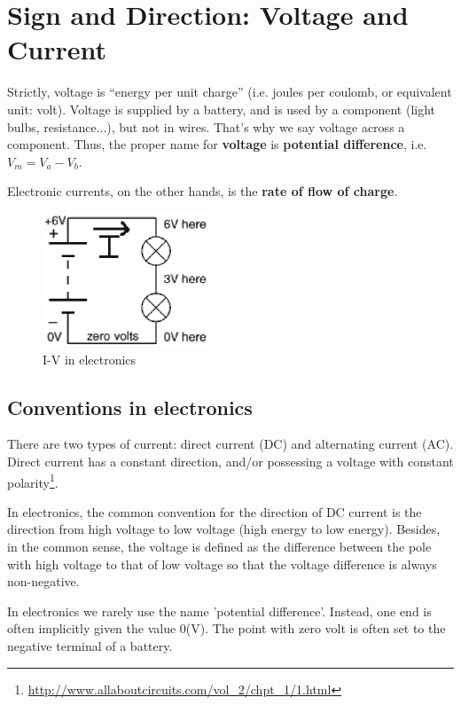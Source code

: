 \section{Sign and Direction: Voltage and Current}
\label{sec:voltage-current}

Strictly, voltage is ``energy per unit charge'' (i.e. joules per coulomb, or
equivalent unit: volt).
Voltage is supplied by a battery, and is used by a component (light bulbs,
resistance...), but not in wires. That's why we say voltage across a component. 
Thus, the proper name for {\bf voltage} is {\bf potential difference}, i.e.
$V_m = V_a - V_b$.

Electronic currents, on the other hands, is the {\bf rate of flow of charge}.


\begin{figure}[hbt]
  \centerline{\includegraphics[height=4cm,
    angle=0]{./images/V_I_direction.eps}}
\caption{I-V in electronics}
\label{fig:V-I_elec}
\end{figure}

\subsection{Conventions in electronics}

There are two types of current: direct current (DC) and alternating current
(AC). Direct current has a constant direction, and/or possessing a voltage with
constant
polarity\footnote{\url{http://www.allaboutcircuits.com/vol_2/chpt_1/1.html}}.

In electronics, the common convention for the direction of DC current is the
direction from high voltage to low voltage (high energy to low energy). Besides,
in the common sense, the voltage is defined as the difference between the pole
with high voltage to that of low voltage so that the voltage difference is
always non-negative.

\begin{mdframed}
In electronics we rarely use the name 'potential difference'. Instead, one end
is often implicitly given the value 0(V). The point with zero volt is
often set to the negative terminal of a battery.
\end{mdframed}

